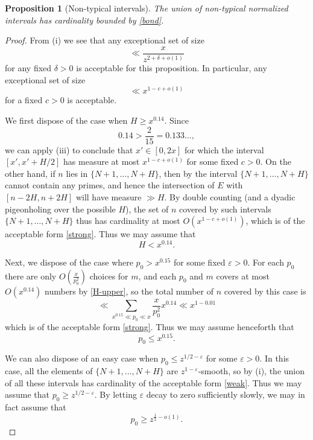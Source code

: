 \documentclass[12pt]{amsart}
\newtheorem{proposition}[theorem]{Proposition}
\newcommand{\eps}{\varepsilon}
\begin{document}
\begin{proposition}[Non-typical intervals]\label{prop-non-typical}  The union of non-typical normalized intervals has cardinality bounded by \eqref{bond}.
\end{proposition}

\begin{proof}
From (i) we see that any exceptional set of size
\begin{equation}\label{weak}
\ll \frac{x}{z^{2+\delta+o(1)}}
\end{equation}
for any fixed $\delta > 0$ is acceptable for this proposition. In particular, any exceptional set of size
\begin{equation}\label{strong}
\ll x^{1-c+o(1)}
\end{equation}
for a fixed $c>0$ is acceptable.

We first dispose of the case when $H \geq x^{0.14}$. Since
$$0.14 > \frac{2}{15} = 0.133\dots,$$
we can apply (iii) to conclude that $x' \in [0,2x]$ for which the interval $[x', x'+H/2]$ has measure at most $x^{1-c+o(1)}$ for some fixed $c>0$.  On the other hand, if $n$ lies in $\{N+1,\dots,N+H\}$, then by  the interval $\{N+1,\dots,N+H\}$ cannot contain any primes, and hence the intersection of $E$ with $[n-2H, n+2H]$ will have measure $\gg H$.  By double counting (and a dyadic pigeonholing over the possible $H$), the set of $n$ covered by such intervals $\{N+1,\dots,N+H\}$ thus has cardinality at most $O(x^{1-c+o(1)})$, which is of the acceptable form \eqref{strong}. Thus we may assume that
\begin{equation}\label{H-upper}
    H < x^{0.14}.
\end{equation}

Next, we dispose of the case where $p_0 > x^{0.15}$ for some fixed $\eps>0$.  For each $p_0$ there are only $O(\frac{x}{p_0^2})$ choices for $m$, and each $p_0$ and $m$ covers at most $O(x^{0.14})$ numbers by \eqref{H-upper}, so the total number of $n$ covered by this case is
$$ \ll \sum_{x^{0.15} \ll p_0 \ll x} \frac{x}{p_0^2} x^{0.14} \ll x^{1-0.01}$$
which is of the acceptable form \eqref{strong}.  Thus we may assume henceforth that
\begin{equation}\label{p0-upper}
    p_0 \leq x^{0.15}.
\end{equation}

We can also dispose of an easy case when $p_0 \leq z^{1/2-\eps}$ for some $\eps>0$.  In this case, all the elements of $\{N+1,\dots,N+H\}$ are $z^{1-\eps}$-smooth, so by (i), the union of all these intervals has cardinality of the acceptable form \eqref{weak}.
Thus we may assume that $p_0 \geq z^{1/2-\eps}$.  By letting $\eps$ decay to zero sufficiently slowly, we may in fact assume that
\begin{equation}\label{p0-lower}
    p_0 \geq z^{\frac{1}{2}-o(1)}.
\end{equation}


\end{proof}
\end{document}
